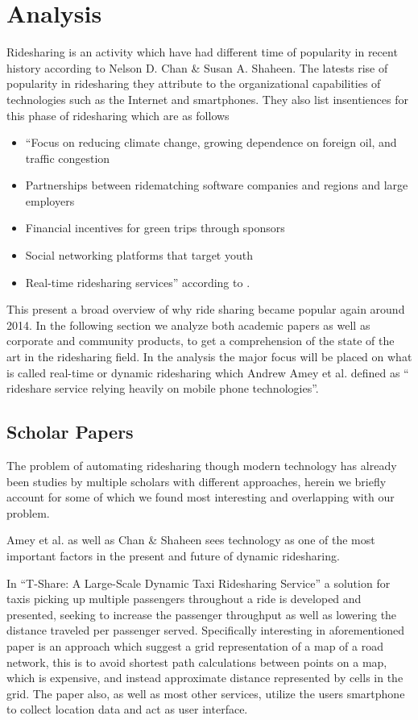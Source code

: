 \section{Analysis}
Ridesharing is an activity which have had different time of popularity in recent history according to Nelson D. Chan \& Susan A. Shaheen\cite{doi:10.1080/01441647.2011.621557}.
The latests rise of popularity in ridesharing they attribute to the organizational capabilities of technologies such as the Internet and smartphones.
They also list insentiences for this phase of ridesharing which are as follows 
\begin{itemize}
  \item ``Focus on reducing climate change, growing dependence on foreign oil, and traffic congestion
  \item Partnerships between ridematching software companies and regions and large employers
  \item Financial incentives for green trips through sponsors
  \item Social networking platforms that target youth
  \item Real-time ridesharing services'' according to \cite{doi:10.1080/01441647.2011.621557}.
\end{itemize}

This present a broad overview of why ride sharing became popular again around 2014.
In the following section we analyze both academic papers as well as corporate and community products, to get a comprehension of the state of the art in the ridesharing field.
In the analysis the major focus will be placed on what is called real-time or dynamic ridesharing which Andrew Amey et al. defined as `` rideshare service relying heavily on mobile phone technologies''\cite{amey2011real}.

\subsection{Scholar Papers}
The problem of automating ridesharing though modern technology has already been studies by multiple scholars with different approaches, herein we briefly account for some of which we found most interesting and overlapping with our problem. 

Amey et al. as well as Chan \& Shaheen sees technology as one of the most important factors in the present and future of dynamic ridesharing\cite{doi:10.1080/01441647.2011.621557, amey2011real}.


In ``T-Share: A Large-Scale Dynamic Taxi Ridesharing Service'' \cite{ShuoMa2013} a solution for taxis picking up multiple passengers throughout a ride is developed and presented, seeking to increase the passenger throughput as well as lowering the distance traveled per passenger served.
Specifically interesting in aforementioned paper is an approach which suggest a grid representation of a map of a road network, this is to avoid shortest path calculations between points on a map, which is expensive, and instead approximate distance represented by cells in the grid.
The paper also, as well as most other services, utilize the users smartphone to collect location data and act as user interface.

